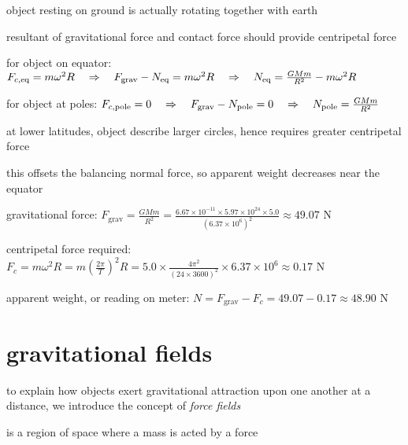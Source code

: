 object resting on ground is actually rotating together with earth

resultant of gravitational force and contact force should provide centripetal force

for object on equator: $F_{c,\text{eq}} = m\omega^2 R \quad \Rightarrow \quad F_\text{grav} - N_\text{eq} = m \omega^2 R  \quad \Rightarrow \quad N_\text{eq} = \frac{GMm}{R^2} - m \omega^2 R$

for object at poles: $F_{c,\text{pole}} = 0 \quad \Rightarrow \quad F_\text{grav} - N_\text{pole} = 0  \quad \Rightarrow \quad N_\text{pole} = \frac{GMm}{R^2}$

at lower latitudes, object describe larger circles, hence requires greater centripetal force

this offsets the balancing normal force, so apparent weight decreases near the equator


\begin{soln} gravitational force: $F_\text{grav} = \frac{GMm}{R^2} = \frac{6.67\times10^{-11}\times5.97\times10^{24}\times5.0}{(6.37\times10^6)^2} \approx 49.07 \text{ N}$

centripetal force required: $F_c = m\omega^2 R = m\left(\frac{2\pi}{T}\right)^2R = 5.0\times\frac{4\pi^2}{(24\times3600)^2}\times6.37\times10^6 \approx 0.17 \text{ N}$

apparent weight, or reading on meter: $N = F_\text{grav} - F_c = 49.07 - 0.17 \approx 48.90 \text{ N}$ \end{soln}




\chapter{gravitational fields}

to explain how objects exert gravitational attraction upon one another at a distance, we introduce the concept of \emph{force fields}

\begin{ilight}
	 is a region of space where a mass is acted by a force
\end{ilight}

